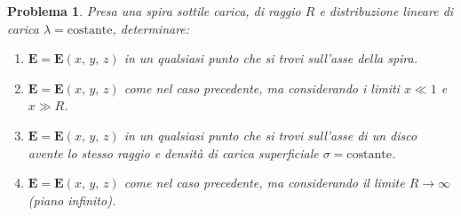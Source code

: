 \documentclass[b5paper,twoside]{book}
\newtheorem{problema}{Problema}
\renewcommand{\vec}[1]{\mathbf{#1}}
\begin{document}
\begin{problema}
	Presa una spira sottile carica, di raggio $R$ e 
	distribuzione lineare di carica $\lambda = \mathrm{costante}$, 
	determinare:
	\begin{enumerate}
		\item $\vec{E} = \vec{E}(x,\,y,\,z)$ in un qualsiasi punto 
		che si trovi sull'asse della spira.
		\item $\vec{E} = \vec{E}(x,\,y,\,z)$ come nel caso precedente,
		ma considerando i limiti $x \ll 1$ e $x \gg R$.
		\item $\vec{E} = \vec{E}(x,\,y,\,z)$ in un qualsiasi punto 
		che si trovi sull'asse di un disco avente lo stesso raggio
		e densità di carica superficiale $\sigma = \mathrm{costante}$.
		\item $\vec{E} = \vec{E}(x,\,y,\,z)$ come nel caso precedente,
		ma considerando il limite $R \longrightarrow \infty$ (piano infinito).
	\end{enumerate}
\end{problema}
\end{document}
